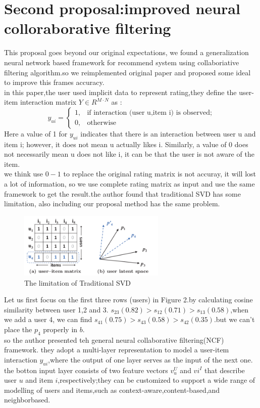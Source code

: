 \documentclass{acmtog} %
\begin{document}
\section{Second proposal:improved neural colloraborative filtering}
This proposal goes beyond our original expectations, we found a generalization neural network based framework for recommend system using collaboriative filtering algorithm.so we reimplemented original paper and proposed some ideal to improve this frames accuracy.\\
in this paper,the user used implicit data to represent rating,they define the user-item interaction matrix $Y\in R^{M\cdot N}$ as :
\begin{equation}
y_{ui}=\left\{
\begin{aligned}
1, & \text{if interaction (user u,item i) is observed;}\\
0, & \text{otherwise}
\end{aligned}
\right.
\end{equation}
Here a value of 1 for $y_{ui}$ indicates that there is an interaction between user u and item i; however, it does not mean u actually likes i. Similarly, a value of 0 does not necessarily mean u does not like i, it can be that the user is not aware of the item. \\
we think use $0-1$ to replace the original rating matrix is not accuray, it will lost a lot of information, so we use complete rating matrix as input and use the same framework to get the result.the author found that traditional SVD has some limitation, also including our proposal method has the same problem.\\
\begin{figure}[htbp]
	\centering
	\includegraphics[width=7cm]{pa2}
	\caption{The limitation of Traditional SVD}
	\label{fig:pa2}
\end{figure}

Let us first focus on the first three rows (users) in Figure 2.by calculating cosine similarity between user 1,2 and 3. $s_{23}(0.82)>s_{12}(0.71)>s_{13}(0.58)$,when we add a user 4, we can find $s_{41}(0.75)>s_{43}(0.58)>s_{42}(0.35)$.but we can't place the $p_4$ properly in $b$. \\
so the author presented teh general neural collaborative filtering(NCF) framework. they adopt a multi-layer representation to model a user-item interaction $y_{ui}$,where the output of one layer serves as the input of the next one. the botton input layer consists of two feature vectors $v_u^U$ and $vi^I$ that describe user $u$ and item $i$,respectively;they can be customized to support a wide range of modelling of users and items,such as context-aware,content-based,and neighborbased.\\
\end{document}
